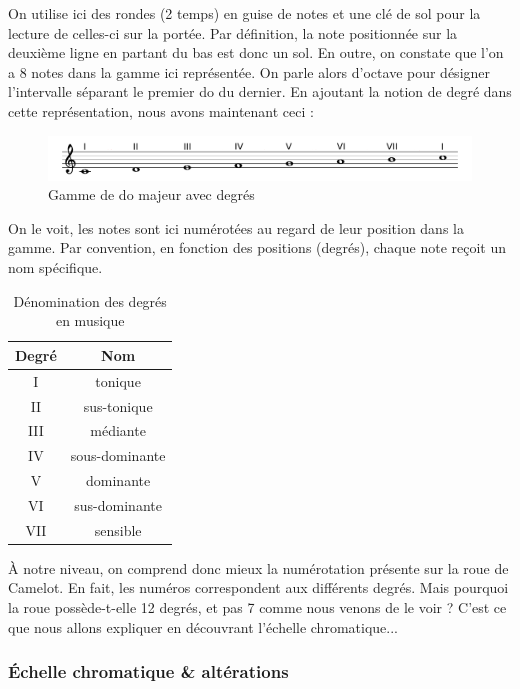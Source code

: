 \documentclass[a4paper,12pt]{article}
\begin{document}
On utilise ici des rondes (2 temps) en guise de notes et une clé de sol pour la lecture de celles-ci sur la portée. Par définition, la note positionnée sur la deuxième ligne en partant du bas est donc un sol.
En outre, on constate que l'on a 8 notes dans la gamme ici représentée. On parle alors d'octave pour désigner l'intervalle séparant le premier do du dernier. En ajoutant la notion de degré dans cette représentation, nous avons maintenant ceci :

\begin{figure}[h]
  \begin{center}
    \includegraphics[scale=0.4]{gamme-do-degres.png}
    \caption{Gamme de do majeur avec degrés}
  \end{center}
\end{figure}

On le voit, les notes sont ici numérotées au regard de leur position dans la gamme. Par convention, en fonction des positions (degrés), chaque note reçoit un nom spécifique.

\begin{table}[h]
  \centering
  \begin{tabular}{|c|c|}
    \hline
    \textbf{Degré} & \textbf{Nom} \\
    \hline
    I & tonique \\
    II & sus-tonique \\
    III & médiante \\
    IV & sous-dominante \\
    V & dominante \\
    VI & sus-dominante \\
    VII & sensible \\
    \hline
  \end{tabular}
  \caption{Dénomination des degrés en musique}
\end{table}

À notre niveau, on comprend donc mieux la numérotation présente sur la roue de Camelot. En fait, les numéros correspondent aux différents degrés. Mais pourquoi la roue possède-t-elle 12 degrés, et pas 7 comme nous venons de le voir ? C'est ce que nous allons expliquer en découvrant l'échelle chromatique...

\subsubsection{Échelle chromatique \& altérations}
\end{document}
